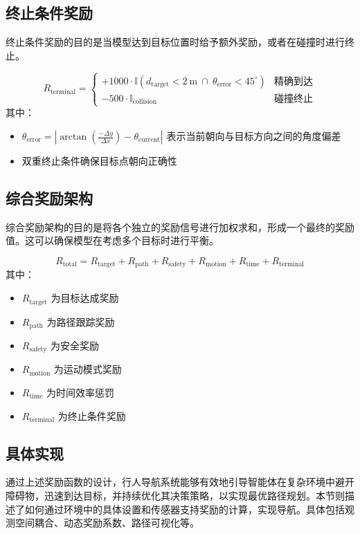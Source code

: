 \subsection{终止条件奖励}
终止条件奖励的目的是当模型达到目标位置时给予额外奖励，或者在碰撞时进行终止。

\begin{equation}
R_{\text{terminal}} =
\begin{cases}
+1000 \cdot \mathbb{I}(d_{\text{target}} < 2\ \text{m}\ \cap\ \theta_{\text{error}} < 45^\circ) & \text{精确到达} \\
-500 \cdot \mathbb{I}_{\text{collision}} & \text{碰撞终止}
\end{cases}
\end{equation}
其中：
\begin{itemize}
    \item \( \theta_{\text{error}} = \left| \arctan\left(\frac{-\Delta y}{\Delta x}\right) - \theta_{\text{current}} \right| \) 表示当前朝向与目标方向之间的角度偏差
    \item 双重终止条件确保目标点朝向正确性
\end{itemize}

\subsection{综合奖励架构}
综合奖励架构的目的是将各个独立的奖励信号进行加权求和，形成一个最终的奖励值。这可以确保模型在考虑多个目标时进行平衡。

\begin{equation}
R_{\text{total}} = R_{\text{target}} + R_{\text{path}} + R_{\text{safety}} + R_{\text{motion}} + R_{\text{time}} + R_{\text{terminal}}
\end{equation}
其中：
\begin{itemize}
    \item \( R_{\text{target}} \) 为目标达成奖励
    \item \( R_{\text{path}} \) 为路径跟踪奖励
    \item \( R_{\text{safety}} \) 为安全奖励
    \item \( R_{\text{motion}} \) 为运动模式奖励
    \item \( R_{\text{time}} \) 为时间效率惩罚
    \item \( R_{\text{terminal}} \) 为终止条件奖励
\end{itemize}

\subsection{具体实现}
通过上述奖励函数的设计，行人导航系统能够有效地引导智能体在复杂环境中避开障碍物，迅速到达目标，并持续优化其决策策略，以实现最优路径规划。本节则描述了如何通过环境中的具体设置和传感器支持奖励的计算，实现导航。具体包括观测空间耦合、动态奖励系数、路径可视化等。

